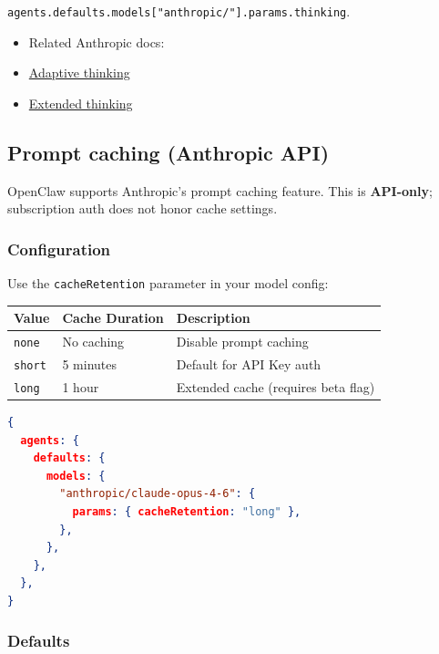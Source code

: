 \texttt{agents.defaults.models["anthropic/"].params.thinking}.
\begin{itemize}
  \item Related Anthropic docs:
  \item \href{https://platform.claude.com/docs/en/build-with-claude/adaptive-thinking}{Adaptive thinking}
  \item \href{https://platform.claude.com/docs/en/build-with-claude/extended-thinking}{Extended thinking}
\end{itemize}


\subsection{Prompt caching (Anthropic API)}


OpenClaw supports Anthropic's prompt caching feature. This is \textbf{API-only}; subscription auth does not honor cache settings.

\subsubsection{Configuration}


Use the \texttt{cacheRetention} parameter in your model config:


\begin{table}[h]
\centering
\small
\begin{tabular}{|l|l|l|}
\hline
Value & Cache Duration & Description \\
\hline
\texttt{none} & No caching & Disable prompt caching \\
\hline
\texttt{short} & 5 minutes & Default for API Key auth \\
\hline
\texttt{long} & 1 hour & Extended cache (requires beta flag) \\
\hline
\end{tabular}
\end{table}



\begin{lstlisting}[language=json]
{
  agents: {
    defaults: {
      models: {
        "anthropic/claude-opus-4-6": {
          params: { cacheRetention: "long" },
        },
      },
    },
  },
}
\end{lstlisting}


\subsubsection{Defaults}


